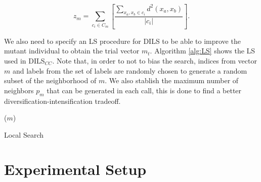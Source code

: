 \documentclass[review]{elsarticle}
\begin{document}
\begin{equation}
z_m = \sum_{c_i \in C_m} \left[ \frac{\sum_{x_a, x_b \in c_i} d^2(x_a,x_b)}{|c_i|}\right].
\label{eq4}
\end{equation}

We also need to specify an LS procedure for DILS to be able to improve the mutant individual to obtain the trial vector $m_t$. Algorithm \ref{alg:LS} shows the LS used in DILS$_{CC}$. Note that, in order to not to bias the search, indices from vector $m$ and labels from the set of labels are randomly chosen to generate a random subset of the neighborhood of $m$. We also stablish the maximum number of neighbors $p_m$ that can be generated in each call, this is done to find a better diversification-intensification tradeoff.

\begin{algorithm}
	\SetNlSkip{0.5em}
	\BlankLine
	\BlankLine
	\KwRet ($m$)
	
	\caption{Local Search}\label{alg:LS}
\end{algorithm}



\clearpage

\section{Experimental Setup} \label{sec:expSetup}
\end{document}
